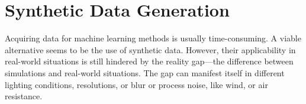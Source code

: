 \section{Synthetic Data Generation}
\label{sec:syntheticdatageneration}

Acquiring data for machine learning methods is usually time-consuming. A viable alternative seems to be the 
use of synthetic data. However, their applicability in real-world situations is still hindered by
the reality gap---the difference between simulations and
real-world situations. The gap can manifest itself in different
lighting conditions, resolutions, or blur or process noise, like wind,
or air resistance.